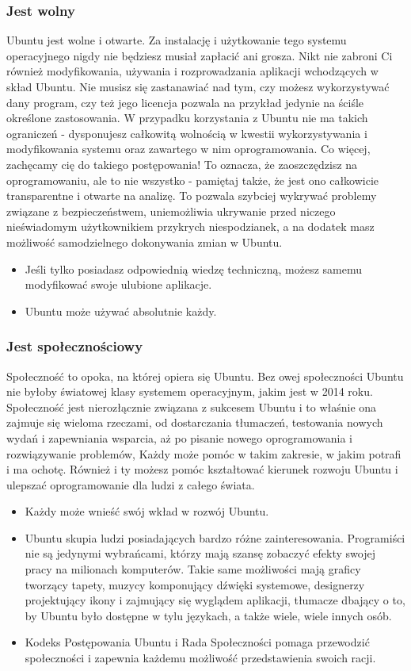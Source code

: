 \subsubsection{Jest wolny}
Ubuntu jest wolne i otwarte. Za instalację i użytkowanie tego systemu operacyjnego nigdy nie będziesz musiał zapłacić ani grosza. Nikt nie zabroni Ci również  modyfikowania, używania i rozprowadzania aplikacji wchodzących w skład Ubuntu. Nie musisz się zastanawiać nad tym, czy możesz wykorzystywać dany program, czy też jego licencja pozwala na przykład jedynie na ściśle określone zastosowania. W przypadku korzystania z Ubuntu nie ma takich ograniczeń - dysponujesz całkowitą wolnością w kwestii wykorzystywania i modyfikowania systemu oraz zawartego w nim oprogramowania.
Co więcej, zachęcamy cię do takiego postępowania! To oznacza, że zaoszczędzisz na oprogramowaniu, ale to nie wszystko - pamiętaj także, że jest ono całkowicie transparentne i otwarte na analizę. To pozwala szybciej wykrywać problemy związane z bezpieczeństwem, uniemożliwia ukrywanie przed niczego nieświadomym użytkownikiem przykrych niespodzianek, a na dodatek masz możliwość samodzielnego  dokonywania zmian w Ubuntu.
\begin{itemize}
\item Jeśli tylko posiadasz odpowiednią wiedzę techniczną, możesz samemu modyfikować swoje ulubione aplikacje.
\item Ubuntu może używać absolutnie każdy.
\end{itemize}
\subsubsection{Jest społecznościowy}
Społeczność to opoka, na której opiera się Ubuntu. Bez owej społeczności Ubuntu nie byłoby światowej klasy systemem operacyjnym, jakim jest w 2014 roku. Społeczność jest nierozłącznie związana z sukcesem Ubuntu i to właśnie ona zajmuje się wieloma rzeczami, od dostarczania tłumaczeń, testowania nowych wydań i zapewniania wsparcia, aż po pisanie nowego oprogramowania i rozwiązywanie problemów,  Każdy może pomóc w takim zakresie, w jakim potrafi i ma ochotę. Również i ty możesz pomóc kształtować kierunek rozwoju Ubuntu i ulepszać oprogramowanie dla ludzi z całego świata.
\begin{itemize}
\item Każdy może wnieść swój wkład w rozwój Ubuntu.
\item Ubuntu skupia ludzi posiadających bardzo różne zainteresowania. Programiści nie są jedynymi wybrańcami, którzy mają szansę zobaczyć efekty swojej pracy na milionach komputerów. Takie same możliwości mają graficy tworzący tapety, muzycy komponujący dźwięki systemowe, designerzy projektujący ikony i zajmujący się wyglądem aplikacji, tłumacze dbający o to, by Ubuntu było dostępne w tylu językach, a także wiele, wiele innych osób.
\item Kodeks Postępowania Ubuntu i Rada Społeczności pomaga przewodzić społeczności i zapewnia każdemu możliwość przedstawienia swoich racji.
\end{itemize}
\clearpage
